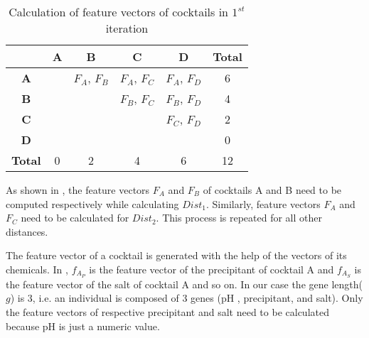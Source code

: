 \begin{table}[htbp]
\begin{center}
\caption{Calculation of feature vectors of cocktails in $1^{st}$ iteration}
\begin{tabular}{|c|c|c|c|c|c|}
\hline
 & \textbf{A} & \textbf{B} & \textbf{C} & \textbf{D} & \textbf{Total} \\
\hline
\textbf{A} & & $F_{A}$, $F_{B}$ & $F_{A}$, $F_{C}$ & $F_{A}$, $F_{D}$ & 6 \\
\hline
\textbf{B} & & & $F_{B}$, $F_{C}$ & $F_{B}$, $F_{D}$ & 4 \\
\hline
\textbf{C} &  &  &  & $F_{C}$, $F_{D}$ & 2 \\
\hline
\textbf{D} &  &  &  &   & 0 \\
\hline
\textbf{Total} & 0 & 2 & 4 & 6 & 12 \\
\hline
\end{tabular}
\label{iteration_1_methodology_table2}
\end{center}
\end{table}

As shown in , the feature vectors $F_{A}$ and $F_{B}$ of cocktails A and B need to be computed respectively while calculating $Dist_{1}$. Similarly, feature vectors $F_{A}$ and $F_{C}$ need to be calculated for $Dist_{2}$. 
This process is repeated for all other distances.
 




The feature vector of a cocktail is generated with the help of the  vectors of its chemicals. In , $f_{A_{P}}$ is the feature vector of the precipitant of  cocktail A and $f_{A_{S}}$ is the feature vector of the salt of  cocktail A and so on.  In our case the gene length($g$) is 3, i.e. an individual is composed  of 3 genes (pH , precipitant, and salt). Only the feature vectors of respective precipitant and salt need to be calculated because pH is just a numeric value.


